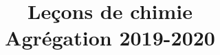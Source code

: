 \documentclass[12pt,a4paper]{article}
\date{}
\title{Leçons de chimie\\Agrégation 2019-2020}
\begin{document}
\maketitle
\tableofcontents




\nocite{*}


\end{document}
